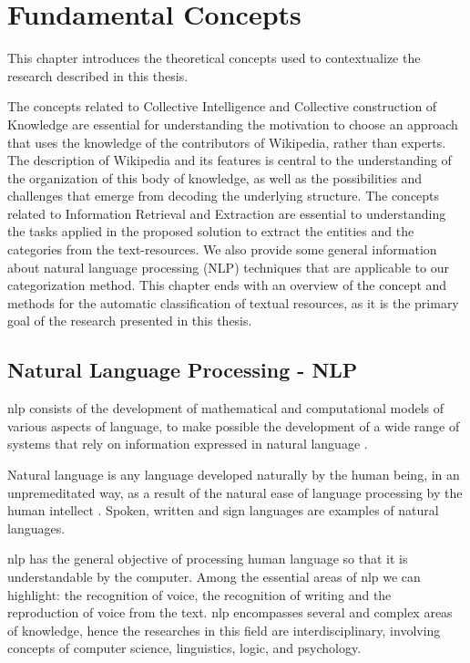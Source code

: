 \chapter{\hspace*{3pt} Fundamental Concepts}
\label{chapter:related-concepts}



This chapter introduces the theoretical concepts used to contextualize the research described in this thesis.

The concepts related to Collective Intelligence and Collective construction of Knowledge are essential for understanding the motivation to choose an approach that uses the knowledge of the contributors of Wikipedia, rather than experts. The description of Wikipedia and its features is central to the understanding of the organization of this body of knowledge, as well as the possibilities and challenges that emerge from decoding  the underlying structure. 
The concepts related to Information Retrieval and Extraction are essential to understanding the tasks applied in the proposed solution to extract the entities and the categories from the text-resources.
We also provide some general information about natural language processing (NLP) techniques that are applicable to our categorization method. 
This chapter ends with an overview of the concept and methods for the automatic classification of textual resources, as it is the primary goal of the research presented in this thesis. 

\section{\hspace*{3pt}Natural Language Processing - NLP}


\gls{nlp} consists of the development of mathematical and computational models of various aspects of language, to make possible the development of a wide range of systems that rely on information expressed in natural language \cite{joshi1991natural}.

Natural language is any language developed naturally by the human being, in an unpremeditated way, as a result of the natural ease of language processing by the human intellect \cite{chomsky1975logical}. Spoken, written and sign languages are examples of natural languages. 

\gls{nlp} has the general objective of processing human language so that it is understandable by the computer. Among the essential areas of \gls{nlp} we can highlight: the recognition of voice, the recognition of writing and the reproduction of voice from the text. \gls{nlp} encompasses several and complex areas of knowledge, hence the  researches in this field are interdisciplinary, involving concepts of computer science, linguistics, logic, and psychology.

